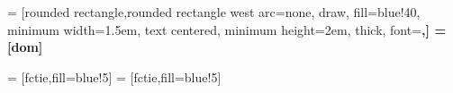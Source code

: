    = [rounded rectangle,rounded rectangle west arc=none, draw, fill=blue!40, minimum width=1.5em, text centered, minimum height=2em, thick, font=\bfseries,]
 = [dom]   


  = [fctie,fill=blue!5]
 = [fctie,fill=blue!5]

%
 
\newcommand{\xmtoonfunctie}[3][]{
\begin{image}[0.5\textwidth]               
  \tikz[scale=1, baseline=(current bounding box.north)]{
  \begin{axis}[grid = major, xlabel = $x$, ylabel = $y$, restrict y to domain=-20:20, #3]

  \IfNoValueTF{#1}
	{\plot[very thick, blue] plot[samples = 500, smooth] expression{#2};} %
	{\plot[very thick, blue, #1] plot[samples = 500, smooth] expression{#2};} %
\end{axis}
}
\end{image}
}
